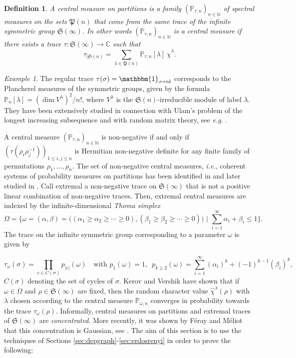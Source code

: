\documentclass[12pt,a4paper,reqno]{amsart}
\newtheorem{definition}[lemma]{Definition}
\theoremstyle{remark}
\newtheorem{example}[lemma]{Example}
\newcommand{\N}{\mathbb{N}}
\newcommand{\C}{\mathbb{C}}
\newcommand{\proba}{\mathbb{P}}
\newcommand{\sym}{\mathfrak{S}}
\newcommand{\pym}{\mathfrak{P}}
\begin{document}
\begin{definition}
A \emph{central measure} on partitions is a family $(\proba_{\tau,n})_{n \in \N}$ of spectral measures on the sets $\pym(n)$ that come from the same trace of the infinite symmetric group $\sym(\infty)$. In other words $(\proba_{\tau,n})_{n \in \N}$ is a central measure if there exists a trace $\tau : \sym(\infty) \to \C$ such that
$$\tau_{|\sym(n)}=\sum_{\lambda \in \pym(n)} \proba_{\tau,n}[\lambda]\,\widehat{\chi}^{\lambda}.$$
\end{definition}

\begin{example}
The regular trace $\tau(\sigma)=\mathbbm{1}_{\sigma=\mathrm{id}}$ corresponds to the Plancherel measures of the symmetric groups, given by the formula $\proba_{n}[\lambda]=(\dim V^\lambda)^{2}/n!$, where $V^{\lambda}$ is the $\sym(n)$-irreducible module of label $\lambda$. They have been extensively studied in connection with Ulam's problem of the longest increasing subsequence and with random matrix theory, see \emph{e.g.} \cite{BDJ99,BOO00,Oko00,IO02}.
\end{example}
\bigskip

A central measure $(\proba_{\tau,n})_{n \in \N}$ is non-negative if and only if $(\tau(\rho_{i}\rho_{j}^{-1}))_{1\leq i,j \leq n}$ is Hermitian non-negative definite for any finite family of permutations $\rho_{1},\ldots,\rho_{n}$. The set of non-negative central measures, \emph{i.e.}, coherent systems of probability measures on partitions has been identified in \cite{Tho64} and later studied in \cite{KV81}. Call extremal a non-negative trace on $\sym(\infty)$  that is not a positive linear combination of non-negative traces. Then, extremal central measures are indexed by the infinite-dimensional \emph{Thoma simplex}
$$\Omega=\bigg\{\omega=(\alpha,\beta)=\big((\alpha_{1}\geq \alpha_{2}\geq \cdots \geq 0),(\beta_{1}\geq \beta_{2}\geq \cdots \geq 0)\big)\,\,\bigg|\,\,\sum_{i=1}^{\infty}\alpha_{i}+\beta_{i}\leq 1\bigg\}.$$
The trace on the infinite symmetric group corresponding to a parameter $\omega$ is given by

\begin{equation}\label{eq:def_tau_omega}
\tau_{\omega}(\sigma)=\prod_{c \in C(\sigma)} p_{|c|}(\omega) \quad\text{with }p_{1}(\omega)=1,\,\,\,p_{k\geq 2}(\omega)=\sum_{i=1}^{\infty}(\alpha_{i})^{k}+(-1)^{k-1}(\beta_{i})^{k},
\end{equation}
$C(\sigma)$ denoting the set of cycles of $\sigma$. Kerov and Vershik have shown that if $\omega \in \Omega$ and $\rho \in \sym(\infty)$ are fixed, then the random character value $\widehat{\chi}^{\lambda}(\rho)$ with $\lambda$ chosen according to the central measure $\proba_{\omega,n}$ converges in probability towards the trace $\tau_{\omega}(\rho)$. Informally, central measures on partitions and extremal traces of $\sym(\infty)$ are {\em concentrated}. More recently, it was shown by F\'eray and M\'eliot that this concentration is Gaussian, see \cite{FM12,Mel12}. The aim of this section is to use the techniques of Sections \ref{sec:depgraph}-\ref{sec:erdosrenyi} in order to prove the following:
\end{document}
